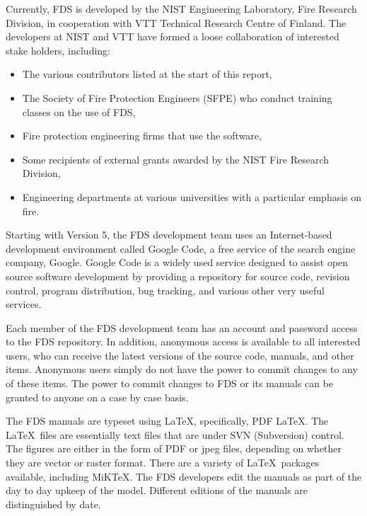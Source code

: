 \documentclass[11pt]{book}
\begin{document}
Currently, FDS is developed by the NIST Engineering Laboratory, Fire Research Division, in cooperation with VTT Technical Research Centre of Finland.
The developers at NIST and VTT have formed a loose collaboration of interested stake holders, including:
\begin{itemize}
\item The various contributors listed at the start of this report,
\item The Society of Fire Protection Engineers (SFPE) who conduct training classes on the use of FDS,
\item Fire protection engineering firms that use the software,
\item Some recipients of external grants awarded by the NIST Fire Research Division,
\item Engineering departments at various universities with a particular emphasis on fire.
\end{itemize}
Starting with Version 5, the FDS development team uses an Internet-based development environment called Google Code, a free service of the search
engine company, Google. Google Code is a widely used service designed to assist open source software development by providing a repository for source
code, revision control, program distribution, bug tracking, and various other very useful services.

Each member of the FDS development team has an account and password access to the FDS repository. In addition, anonymous access is available to all
interested users, who can receive the latest versions of the source code, manuals, and other items. Anonymous users simply do not have the power to
commit changes to any of these items. The power to commit changes to FDS or its manuals can be granted to anyone on a case by case basis.

The FDS manuals are typeset using \LaTeX, specifically, PDF \LaTeX. The \LaTeX\ files are essentially text files that are under SVN (Subversion)
control. The figures are either in the form of PDF or jpeg files, depending on whether they are vector or raster format. There are a variety of
\LaTeX\ packages available, including MiKTeX. The FDS developers edit the manuals as part of the day to day upkeep of the model. Different editions of
the manuals are distinguished by date.
\end{document}
